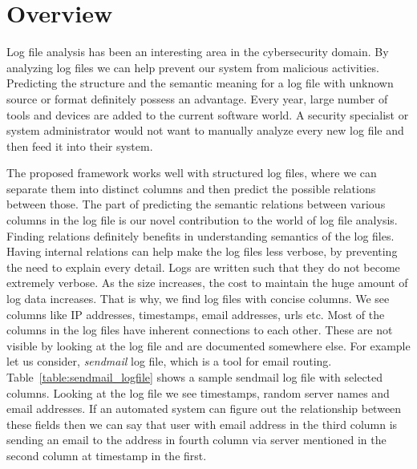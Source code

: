 \chapter{Overview}
\thispagestyle{plain}
\label{Overview}

Log file analysis has been an interesting area in the cybersecurity domain. By analyzing log files we can help prevent our system from malicious activities. Predicting the structure and the semantic meaning for a log file with unknown source or format definitely possess an advantage. Every year, large number of tools and devices are added to the current software world. A security specialist or system administrator would not want to manually analyze every new log file and then feed it into their system. 

The proposed framework works well with structured log files, where we can separate them into distinct columns and then predict the possible relations between those. The part of predicting the semantic relations between various columns in the log file is our novel contribution to the world of log file analysis. Finding relations definitely benefits in understanding semantics of the log files. Having internal relations can help make the log files less verbose, by preventing the need to explain every detail. Logs are written such that they do not become extremely verbose. As the size increases, the cost to maintain the huge amount of log data increases. That is why, we find log files with concise columns. We see columns like IP addresses, timestamps, email addresses, urls etc. Most of the columns in the log files have inherent connections to each other. These are not visible by looking at the log file and are documented somewhere else. For example let us consider, \textit{sendmail} log file, which is a tool for email routing. Table~\ref{table:sendmail_logfile} shows a sample sendmail log file with selected columns. Looking at the log file we see timestamps, random server names and email addresses. If an automated system can figure out the relationship between these fields then we can say that user with email address in the third column is sending an email to the address in fourth column via server mentioned in the second column at timestamp in the first.


